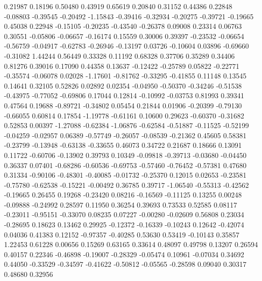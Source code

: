    0.21987  0.18196
   0.50480  0.43919
   0.65619  0.20840
   0.31152  0.44386
   0.22848 -0.08803
  -0.39545 -0.20492
  -1.15843 -0.39416
  -0.32934 -0.20275
  -0.39721 -0.19665
   0.45038  0.22948
  -0.15105 -0.20235
  -0.43540 -0.26378
   0.09008  0.23314
   0.06763  0.30551
  -0.05806 -0.06657
  -0.16174  0.15559
   0.30006  0.39397
  -0.23532 -0.06654
  -0.56759 -0.04917
  -0.62783 -0.26946
  -0.13197  0.03726
  -0.10604  0.03896
  -0.69660 -0.31082
   1.44244  0.56449
   0.33328  0.11192
   0.68328  0.37706
   0.35289  0.34406
   0.81276  0.39016
   0.17090  0.44358
   0.13637 -0.12422
  -0.25789  0.05822
  -0.22771 -0.35574
  -0.06078  0.02028
  -1.17601 -0.81762
  -0.33295 -0.41855
   0.11148  0.13545
   0.14641  0.32105
   0.52826  0.02892
   0.02354 -0.04950
  -0.50370 -0.34246
  -0.51538 -0.43975
  -0.77052 -0.69806
   0.17044  0.12814
  -0.10992 -0.03753
   0.81993  0.39341
   0.47564  0.19688
  -0.89721 -0.34802
   0.05454  0.21844
   0.01906 -0.20399
  -0.79130 -0.66055
   0.60814  0.17854
  -1.19778 -0.61161
   0.10600  0.29623
  -0.60370 -0.31682
   0.52853  0.00397
  -1.27088 -0.62384
  -1.06876 -0.62584
  -0.51887 -0.11525
  -0.52199 -0.04259
  -0.02957  0.06389
  -0.57749 -0.26057
  -0.08539 -0.21362
   0.45605  0.58381
  -0.23799 -0.13948
  -0.63138 -0.33655
   0.46073  0.34722
   0.21687  0.18666
   0.13091  0.11722
  -0.60706 -0.13902
   0.39793  0.10349
  -0.09818 -0.39713
  -0.03680 -0.04450
   0.36337  0.07401
  -0.68286 -0.60536
  -0.69753 -0.57460
  -0.76452 -0.57381
   0.47680  0.31334
  -0.90106 -0.48301
  -0.40085 -0.01732
  -0.25370  0.12015
   0.02653 -0.23581
  -0.75780 -0.62538
  -0.15221 -0.00492
   0.36785  0.39717
  -1.06540 -0.55313
  -0.42562 -0.19665
   0.26455  0.19268
  -0.23420  0.08216
  -0.16569 -0.11125
   0.13255  0.00248
  -0.09888 -0.24992
   0.28597  0.11950
   0.36254  0.39693
   0.73533  0.52585
   0.08117 -0.23011
  -0.95151 -0.33070
   0.08235  0.07227
  -0.00280 -0.02609
   0.56808  0.23034
  -0.28695  0.18623
   0.13462  0.29925
  -0.12372 -0.16339
  -0.10243  0.12642
  -0.42074  0.04036
   0.41383  0.12152
  -0.97357 -0.40285
   0.53630  0.53419
  -0.10143  0.35857
   1.22453  0.61228
   0.00656  0.15269
   0.63165  0.33614
   0.48097  0.49798
   0.13207  0.26594
   0.40157  0.22346
  -0.46898 -0.19007
  -0.28329 -0.05474
   0.10961 -0.07034
   0.34692  0.44050
  -0.33529 -0.34597
  -0.41622 -0.50812
  -0.05565 -0.28598
   0.09040  0.30317
   0.48680  0.32956
